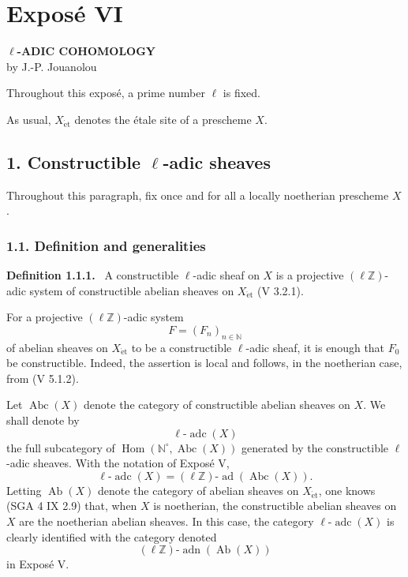 \documentclass[11pt]{article}
\newenvironment{statement}[1]{\par\medskip\noindent\textbf{#1.}\ }{\par\medskip}
\DeclareMathOperator{\Hom}{Hom}
\providecommand{\Hom}{\operatorname{Hom}}
\providecommand{\adn}{\operatorname{adn}}
\providecommand{\Ab}{\operatorname{Ab}}
\providecommand{\Abc}{\operatorname{Abc}}
\providecommand{\adc}{\operatorname{adc}}
\providecommand{\ad}{\operatorname{ad}}
\providecommand{\adn}{\operatorname{adn}}
\providecommand{\Ab}{\operatorname{Ab}}
\begin{document}
\section*{Exposé VI}

\begin{center}
\textbf{\(\ell\)-ADIC COHOMOLOGY}\\[0.5em]
by J.-P. Jouanolou
\end{center}

Throughout this exposé, a prime number \(\ell\) is fixed.

As usual, \(X_{\mathrm{\acute et}}\) denotes the étale site of a prescheme \(X\).

\subsection*{1. Constructible \(\ell\)-adic sheaves}

Throughout this paragraph, fix once and for all a locally noetherian prescheme \(X\).

\subsubsection*{1.1. Definition and generalities}

\begin{statement}{Definition 1.1.1}
A constructible \(\ell\)-adic sheaf on \(X\) is a projective \((\ell\mathbb Z)\)-adic system of constructible abelian sheaves on \(X_{\mathrm{\acute et}}\) (V 3.2.1).
\end{statement}

For a projective \((\ell\mathbb Z)\)-adic system
\[
F=(F_n)_{n\in\mathbb N}
\]
of abelian sheaves on \(X_{\mathrm{\acute et}}\) to be a constructible \(\ell\)-adic sheaf, it is enough that \(F_0\) be constructible. Indeed, the assertion is local and follows, in the noetherian case, from (V 5.1.2).

Let \(\Abc(X)\) denote the category of constructible abelian sheaves on \(X\). We shall denote by
\[
\ell\text{-}\adc(X)
\]
the full subcategory of \(\Hom(\mathbb N^\circ,\Abc(X))\) generated by the constructible \(\ell\)-adic sheaves. With the notation of Exposé V,
\[
\ell\text{-}\adc(X)=(\ell\mathbb Z)\text{-}\ad(\Abc(X)).
\]
Letting \(\Ab(X)\) denote the category of abelian sheaves on \(X_{\mathrm{\acute et}}\), one knows (SGA 4 IX 2.9) that, when \(X\) is noetherian, the constructible abelian sheaves on \(X\) are the noetherian abelian sheaves. In this case, the category \(\ell\text{-}\adc(X)\) is clearly identified with the category denoted
\[
(\ell\mathbb Z)\text{-}\adn(\Ab(X))
\]
in Exposé V.
\end{document}
